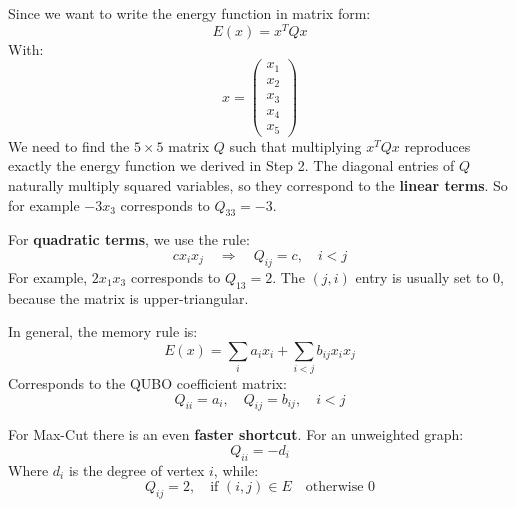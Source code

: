 \begin{deepeningbox}
    Since we want to write the energy function in matrix form:
    \begin{equation*}
        E(x) = x^{T} Q x
    \end{equation*}
    With:
    \begin{equation*}
        x =
        \begin{pmatrix}
            x_1 \\
            x_2 \\
            x_3 \\
            x_4 \\
            x_5
        \end{pmatrix}
    \end{equation*}
    We need to find the $5\times 5$ matrix $Q$ such that multiplying $x^T Q x$ reproduces exactly the energy function we derived in Step 2. The diagonal entries of $Q$ naturally multiply squared variables, so they correspond to the \textbf{linear terms}. So for example $-3x_3$ corresponds to $Q_{33} = -3$.

    \highspace
    For \textbf{quadratic terms}, we use the rule:
    \begin{equation*}
        c x_i x_j \quad \Rightarrow \quad Q_{ij} = c, \quad i < j
    \end{equation*}
    For example, $2 x_1 x_3$ corresponds to $Q_{13} = 2$. The $(j,i)$ entry is usually set to $0$, because the matrix is upper-triangular.

    \highspace
    In general, the memory rule is:
    \begin{equation*}
        E(x) = \sum_{i} a_{i}x_{i} + \sum_{i<j} b_{ij}x_{i}x_{j}
    \end{equation*}
    Corresponds to the QUBO coefficient matrix:
    \begin{equation*}
        Q_{ii} = a_i, \quad Q_{ij} = b_{ij}, \quad i < j
    \end{equation*}

    \highspace
    \textcolor{Green3}{} For Max-Cut there is an even \textbf{faster shortcut}. For an unweighted graph:
    \begin{equation*}
        Q_{ii} = -d_i
    \end{equation*}
    Where $d_i$ is the degree of vertex $i$, while:
    \begin{equation*}
        Q_{ij} = 2, \quad \text{if } (i,j) \in E \quad \text{otherwise } 0
    \end{equation*}
\end{deepeningbox}

